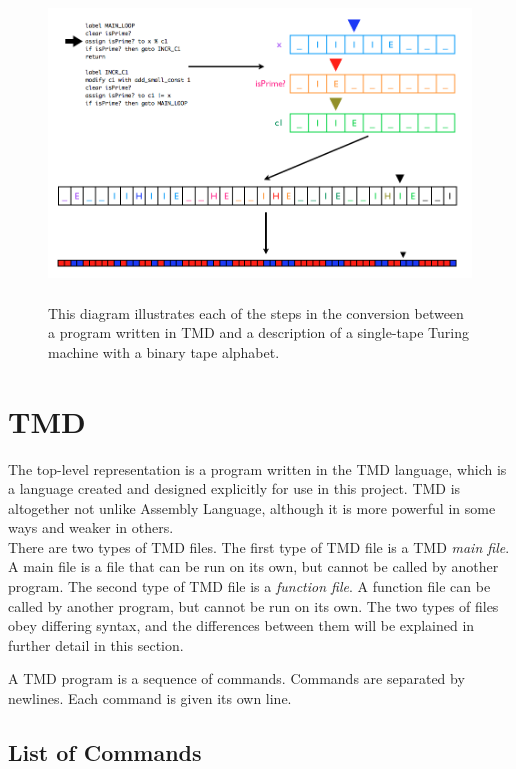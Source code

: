 \documentclass{report}
\begin{document}
\begin{figure} 
\begin{center} 
\includegraphics[height=3.25in,width=5in,angle=0]{figs/process.png} 
\caption{This diagram illustrates each of the steps in the conversion between a program written in TMD and a description of a single-tape Turing machine with a binary tape alphabet.\label{fig:process}} 
\end{center} 
\end{figure}  

\section{TMD}

The top-level representation is a program written in the TMD language, which is a language created and designed explicitly for use in this project. TMD is altogether not unlike Assembly Language, although it is more powerful in some ways and weaker in others. \\

There are two types of TMD files. The first type of TMD file is a TMD \emph{main file}. A main file is a file that can be run on its own, but cannot be called by another program. The second type of TMD file is a \emph{function file}. A function file can be called by another program, but cannot be run on its own. The two types of files obey differing syntax, and the differences between them will be explained in further detail in this section.

A TMD program is a sequence of commands. Commands are separated by newlines. Each command is given its own line. \\

\subsection{List of Commands}
\end{document}

